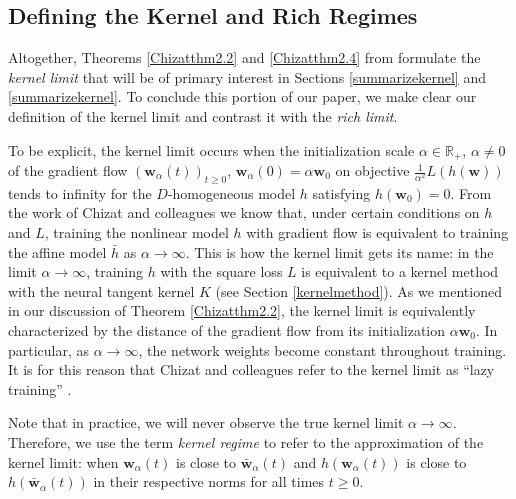 \documentclass{article}
\begin{document}
\subsection{Defining the Kernel and Rich Regimes}\label{defkernelrich}

Altogether, Theorems \ref{Chizatthm2.2} and \ref{Chizatthm2.4} from \cite{chizat2018lazy} formulate the \textit{kernel limit} that will be of primary interest in Sections \ref{summarizekernel} and \ref{summarizekernel}. To conclude this portion of our paper, we make clear our definition of the kernel limit and contrast it with the \textit{rich limit}. 

To be explicit, the kernel limit occurs when the initialization scale $\alpha \in \mathbb{R}_+$, $\alpha \neq 0$ of the gradient flow $(\boldsymbol{w}_{\alpha}(t))_{t \geq 0}$, $\boldsymbol{w}_{\alpha}(0) = \alpha \boldsymbol{w}_0$ on objective $\frac{1}{\alpha^2}L(h(\boldsymbol{w}))$ tends to infinity for the $D$-homogeneous model $h$ satisfying $h(\boldsymbol{w}_0) = 0$. From the work of Chizat and colleagues we know that, under certain conditions on $h$ and $L$, training the nonlinear model $h$ with gradient flow is equivalent to training the affine model $\bar{h}$ as $\alpha \rightarrow \infty$. This is how the kernel limit gets its name: in the limit $\alpha \rightarrow \infty$, training $h$ with the square loss $L$ is equivalent to a kernel method with the neural tangent kernel $K$ (see Section \ref{kernelmethod}). As we mentioned in our discussion of Theorem \ref{Chizatthm2.2}, the kernel limit is equivalently characterized by the distance of the gradient flow from its initialization $\alpha \boldsymbol{w}_0$. In particular, as $\alpha \rightarrow \infty$, the network weights become constant throughout training. It is for this reason that Chizat and colleagues refer to the kernel limit as \enquote{lazy training} \cite{chizat2018lazy}. 

Note that in practice, we will never observe the true kernel limit $\alpha \rightarrow \infty$. Therefore, we use the term \textit{kernel regime} to refer to the approximation of the kernel limit: when $\boldsymbol{w}_{\alpha}(t)$ is close to $\boldsymbol{\bar{w}}_{\alpha}(t)$ and $h(\boldsymbol{w}_{\alpha}(t))$ is close to $h(\boldsymbol{\bar{w}}_{\alpha}(t))$ in their respective norms for all times $t \geq 0$.
\end{document}
